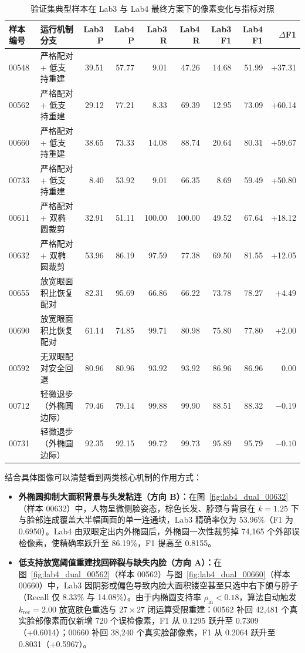 \begin{table}[H]
\centering\small
\setlength{\tabcolsep}{3.5pt}
\caption{验证集典型样本在 Lab3 与 Lab4 最终方案下的像素变化与指标对照}\label{tab:lab4_cases}
\begin{tabular}{llrrrrrrr}
\toprule
样本编号 & 运行机制分支 & Lab3 P & Lab4 P & Lab3 R & Lab4 R & Lab3 F1 & Lab4 F1 & $\Delta$F1 \\
\midrule
00548 & 严格配对 + 低支持重建 & 39.51 & 57.77 & 9.01 & 47.26 & 14.68 & 51.99 & +37.31 \\
00562 & 严格配对 + 低支持重建 & 29.12 & 77.21 & 8.33 & 69.39 & 12.95 & 73.09 & +60.14 \\
00660 & 严格配对 + 低支持重建 & 38.65 & 73.33 & 14.08 & 88.74 & 20.64 & 80.31 & +59.67 \\
00733 & 严格配对 + 低支持重建 & 8.40 & 53.92 & 9.01 & 66.35 & 8.69 & 59.49 & +50.80 \\
00611 & 严格配对 + 双椭圆裁剪 & 32.91 & 51.11 & 100.00 & 100.00 & 49.52 & 67.64 & +18.12 \\
00632 & 严格配对 + 双椭圆裁剪 & 53.96 & 86.19 & 97.59 & 77.38 & 69.50 & 81.55 & +12.05 \\
00655 & 放宽眼面积比恢复配对 & 82.31 & 95.69 & 66.86 & 66.22 & 73.78 & 78.27 & +4.49 \\
00690 & 放宽眼面积比恢复配对 & 61.14 & 74.85 & 99.71 & 80.98 & 75.80 & 77.80 & +2.00 \\
00592 & 无双眼配对安全回退 & 80.96 & 80.96 & 93.92 & 93.92 & 86.96 & 86.96 & 0.00 \\
00712 & 轻微退步（外椭圆边际） & 79.46 & 79.14 & 99.88 & 99.90 & 88.51 & 88.32 & $-0.19$ \\
00731 & 轻微退步（外椭圆边际） & 92.35 & 92.15 & 99.72 & 99.73 & 95.89 & 95.79 & $-0.10$ \\
\bottomrule
\end{tabular}
\end{table}

结合具体图像可以清楚看到两类核心机制的作用方式：
\begin{itemize}
\item \textbf{外椭圆抑制大面积背景与头发粘连（方向 B）：}在图~\ref{fig:lab4_dual_00632}（样本 00632）中，人物呈微侧脸姿态，棕色长发、脖颈与背景在 $k=1.25$ 下与脸部连成覆盖大半幅画面的单一连通块，Lab3 精确率仅为 53.96\%（F1 为 0.6950）。Lab4 由双眼定出内外椭圆后，外椭圆一次性裁剪掉 74,165 个外部误检像素，使精确率跃升至 86.19\%，F1 提高至 0.8155。
\item \textbf{低支持放宽阈值重建找回碎裂与缺失内脸（方向 A）：}在图~\ref{fig:lab4_dual_00562}（样本 00562）与图~\ref{fig:lab4_dual_00660}（样本 00660）中，Lab3 因阴影或偏色导致内脸大面积镂空甚至只选中右下颌与脖子（Recall 仅 8.33\% 与 14.08\%）。由于内椭圆支持率 $\rho_{\text{in}}<0.18$，算法自动触发 $k_{\text{rec}}=2.00$ 放宽肤色重选与 $27\times27$ 闭运算受限重建：00562 补回 42,481 个真实脸部像素而仅新增 720 个误检像素，F1 从 0.1295 跃升至 0.7309（+0.6014）；00660 补回 38,240 个真实脸部像素，F1 从 0.2064 跃升至 0.8031（+0.5967）。
\end{itemize}

